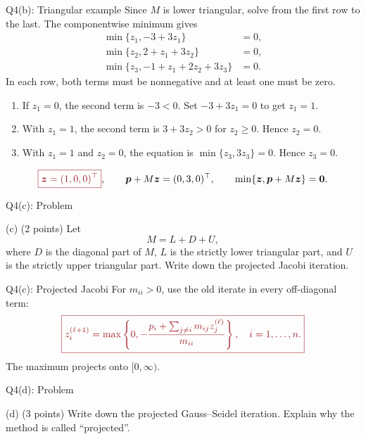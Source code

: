 \documentclass{beamer}
\newcommand{\keymath}[1]{\textcolor{lecturekey}{#1}}
\newcommand{\keybox}[1]{\keymath{\boxed{#1}}}
\begin{document}
\begin{frame}{Q4(b): Triangular example}
\footnotesize
Since $M$ is lower triangular, solve from the first row to the last.
The componentwise minimum gives
\begin{align*}
\min\{z_1,-3+3z_1\}&=0,\\
\min\{z_2,2+z_1+3z_2\}&=0,\\
\min\{z_3,-1+z_1+2z_2+3z_3\}&=0.
\end{align*}
In each row, both terms must be nonnegative and at least one must be zero.
\begin{enumerate}
\item If $z_1=0$, the second term is $-3<0$. Set
$-3+3z_1=0$ to get $z_1=1$.
\item With $z_1=1$, the second term is $3+3z_2>0$ for $z_2\geq0$.
Hence $z_2=0$.
\item With $z_1=1$ and $z_2=0$, the equation is
$\min\{z_3,3z_3\}=0$. Hence $z_3=0$.
\end{enumerate}
\[
\keybox{\bm z=(1,0,0)^\top},\qquad
\bm p+M\bm z=(0,3,0)^\top,\qquad
\min\{\bm z,\bm p+M\bm z\}=\bm0.
\]
\end{frame}

\begin{frame}{Q4(c): Problem}
\footnotesize
\setlength{\abovedisplayskip}{5pt}
\setlength{\belowdisplayskip}{5pt}
\begin{block}{(c) \hfill (2 points)}
Let
\[
M=L+D+U,
\]
where $D$ is the diagonal part of $M$, $L$ is the strictly lower triangular part,
and $U$ is the strictly upper triangular part. Write down the projected Jacobi
iteration.
\end{block}
\end{frame}

\begin{frame}{Q4(c): Projected Jacobi}
\small
For $m_{ii}>0$, use the old iterate in every off-diagonal term:
\[
\keybox{z_i^{(\ell+1)}=
\max\left\{0,-\frac{p_i+\sum_{j\ne i}m_{ij}z_j^{(\ell)}}{m_{ii}}\right\},
\quad i=1,\ldots,n.}
\]
The maximum projects onto $[0,\infty)$.
\end{frame}

\begin{frame}{Q4(d): Problem}
\footnotesize
\setlength{\abovedisplayskip}{5pt}
\setlength{\belowdisplayskip}{5pt}
\begin{block}{(d) \hfill (3 points)}
Write down the projected Gauss--Seidel iteration. Explain why the method is
called \textquotedblleft{}projected\textquotedblright.
\end{block}
\end{frame}
\end{document}
